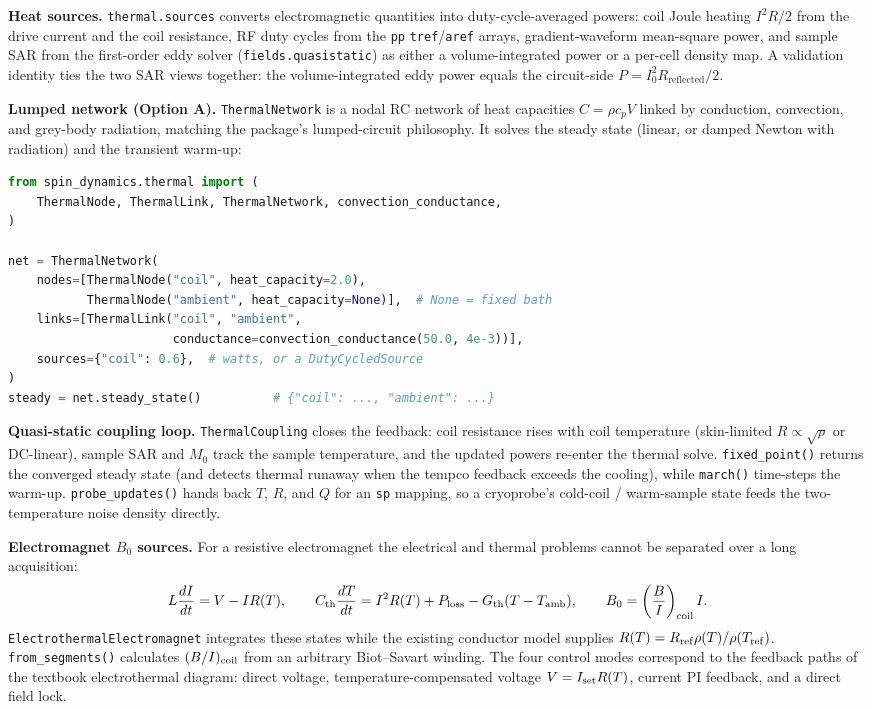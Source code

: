 \documentclass[11pt,oneside]{report}
\newcommand{\code}[1]{\texttt{#1}}
\begin{document}
\textbf{Heat sources.} \code{thermal.sources} converts electromagnetic
quantities into duty-cycle-averaged powers: coil Joule heating \(I^2R/2\) from
the drive current and the coil resistance, RF duty cycles from the \code{pp}
\code{tref}/\code{aref} arrays, gradient-waveform mean-square power, and sample
SAR from the first-order eddy solver (\code{fields.quasistatic}) as either a
volume-integrated power or a per-cell density map. A validation identity ties
the two SAR views together: the volume-integrated eddy power equals the
circuit-side \(P = I_0^2 R_{\mathrm{reflected}}/2\).

\textbf{Lumped network (Option A).} \code{ThermalNetwork} is a nodal RC network
of heat capacities \(C=\rho c_p V\) linked by conduction, convection, and
grey-body radiation, matching the package's lumped-circuit philosophy. It
solves the steady state (linear, or damped Newton with radiation) and the
transient warm-up:

\begin{lstlisting}[language=Python]
from spin_dynamics.thermal import (
    ThermalNode, ThermalLink, ThermalNetwork, convection_conductance,
)

net = ThermalNetwork(
    nodes=[ThermalNode("coil", heat_capacity=2.0),
           ThermalNode("ambient", heat_capacity=None)],  # None = fixed bath
    links=[ThermalLink("coil", "ambient",
                       conductance=convection_conductance(50.0, 4e-3))],
    sources={"coil": 0.6},  # watts, or a DutyCycledSource
)
steady = net.steady_state()          # {"coil": ..., "ambient": ...}
\end{lstlisting}

\textbf{Quasi-static coupling loop.} \code{ThermalCoupling} closes the
feedback: coil resistance rises with coil temperature (skin-limited
\(R\propto\sqrt{\rho}\) or DC-linear), sample SAR and \(M_0\) track the sample
temperature, and the updated powers re-enter the thermal solve.
\code{fixed\_point()} returns the converged steady state (and detects thermal
runaway when the tempco feedback exceeds the cooling), while \code{march()}
time-steps the warm-up. \code{probe\_updates()} hands back \(T\), \(R\), and
\(Q\) for an \code{sp} mapping, so a cryoprobe's cold-coil / warm-sample state
feeds the two-temperature noise density directly.

\textbf{Electromagnet $B_0$ sources.} For a resistive electromagnet the
electrical and thermal problems cannot be separated over a long acquisition:
\[
L\frac{dI}{dt}=V-I R(T),\qquad
C_{\rm th}\frac{dT}{dt}=I^2R(T)+P_{\rm loss}
 -G_{\rm th}(T-T_{\rm amb}),\qquad
B_0=\left(\frac{B}{I}\right)_{\rm coil}I .
\]
\code{ElectrothermalElectromagnet} integrates these states while the existing
conductor model supplies $R(T)=R_{\rm ref}\rho(T)/\rho(T_{\rm ref})$.
\code{from\_segments()} calculates $(B/I)_{\rm coil}$ from an arbitrary
Biot--Savart winding. The four control modes correspond to the feedback paths
of the textbook electrothermal diagram: direct voltage, temperature-compensated
voltage $V=I_{\rm set}R(T)$, current PI feedback, and a direct field lock.
\end{document}
